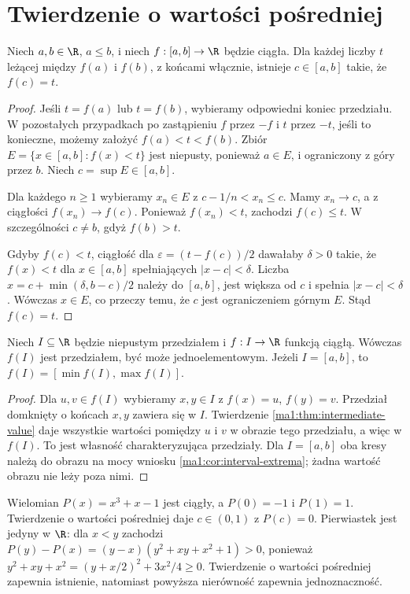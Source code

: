 \section{Twierdzenie o wartości pośredniej}
\begin{twierdzenie}
\label{ma1:thm:intermediate-value}
Niech $a,b\in\R$, $a\le b$, i niech $f:[a,b]\to\R$ będzie ciągła. Dla każdej liczby $t$ leżącej między $f(a)$ i $f(b)$, z końcami włącznie, istnieje $c\in[a,b]$ takie, że $f(c)=t$.
\end{twierdzenie}
\begin{proof}
Jeśli $t=f(a)$ lub $t=f(b)$, wybieramy odpowiedni koniec przedziału. W pozostałych przypadkach po zastąpieniu $f$ przez $-f$ i $t$ przez $-t$, jeśli to konieczne, możemy założyć $f(a)<t<f(b)$. Zbiór
$E=\{x\in[a,b]:f(x)<t\}$ jest niepusty, ponieważ $a\in E$, i ograniczony z góry przez $b$. Niech $c=\sup E\in[a,b]$.

Dla każdego $n\ge1$ wybieramy $x_n\in E$ z $c-1/n<x_n\le c$. Mamy $x_n\to c$, a z ciągłości $f(x_n)\to f(c)$. Ponieważ $f(x_n)<t$, zachodzi $f(c)\le t$. W szczególności $c\ne b$, gdyż $f(b)>t$.

Gdyby $f(c)<t$, ciągłość dla $\varepsilon=(t-f(c))/2$ dawałaby $\delta>0$ takie, że $f(x)<t$ dla $x\in[a,b]$ spełniających $|x-c|<\delta$. Liczba $x=c+\min(\delta,b-c)/2$ należy do $[a,b]$, jest większa od $c$ i spełnia $|x-c|<\delta$. Wówczas $x\in E$, co przeczy temu, że $c$ jest ograniczeniem górnym $E$. Stąd $f(c)=t$.
\end{proof}
\begin{wniosek}
\label{ma1:cor:continuous-interval-image}
Niech $I\subseteq\R$ będzie niepustym przedziałem i $f:I\to\R$ funkcją ciągłą. Wówczas $f(I)$ jest przedziałem, być może jednoelementowym. Jeżeli $I=[a,b]$, to $f(I)=[\min f(I),\max f(I)]$.
\end{wniosek}
\begin{proof}
Dla $u,v\in f(I)$ wybieramy $x,y\in I$ z $f(x)=u$, $f(y)=v$. Przedział domknięty o końcach $x,y$ zawiera się w $I$. Twierdzenie \ref{ma1:thm:intermediate-value} daje wszystkie wartości pomiędzy $u$ i $v$ w obrazie tego przedziału, a więc w $f(I)$. To jest własność charakteryzująca przedziały. Dla $I=[a,b]$ oba kresy należą do obrazu na mocy wniosku \ref{ma1:cor:interval-extrema}; żadna wartość obrazu nie leży poza nimi.
\end{proof}
\begin{przyklad}
\label{ma1:ex:ivt-root}
Wielomian $P(x)=x^3+x-1$ jest ciągły, a $P(0)=-1$ i $P(1)=1$. Twierdzenie o wartości pośredniej daje $c\in(0,1)$ z $P(c)=0$. Pierwiastek jest jedyny w $\R$: dla $x<y$ zachodzi
$P(y)-P(x)=(y-x)(y^2+xy+x^2+1)>0$, ponieważ
$y^2+xy+x^2=(y+x/2)^2+3x^2/4\ge0$.
Twierdzenie o wartości pośredniej zapewnia istnienie, natomiast powyższa nierówność zapewnia jednoznaczność.
\end{przyklad}
